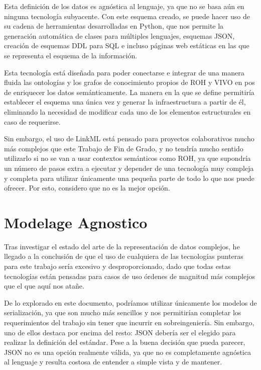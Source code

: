 \documentclass[12pt,a4paper]{article}
\begin{document}
Esta definición de los datos es agnóstica al lenguaje, ya que no se basa aún en ninguna tecnología subyacente. Con este esquema creado, se puede hacer uso de su cadena de herramientas desarrolladas en Python, que nos permite la generación automática de clases para múltiples lenguajes, esquemas JSON, creación de esquemas DDL para SQL e incluso páginas web estáticas en las que se representa el esquema de la información.

Esta tecnología está diseñada para poder conectarse e integrar de una manera fluida las ontologías y los grafos de conocimiento propios de ROH y VIVO en pos de enriquecer los datos semánticamente. La manera en la que se define permitiría establecer el esquema una única vez y generar la infraestructura a partir de él, eliminando la necesidad de modificar cada uno de los elementos estructurales en caso de requerirse.

Sin embargo, el uso de LinkML está pensado para proyectos colaborativos mucho más complejos que este Trabajo de Fin de Grado, y no tendría mucho sentido utilizarlo si no se van a usar contextos semánticos como ROH, ya que supondría un número de pasos extra a ejecutar y depender de una tecnología muy compleja y completa para utilizar únicamente una pequeña parte de todo lo que nos puede ofrecer. Por esto, considero que no es la mejor opción.


\section{Modelage Agnostico}

Tras investigar el estado del arte de la representación de datos complejos, he llegado a la conclusión de que el uso de cualquiera de las tecnologías punteras para este trabajo sería excesivo y desproporcionado, dado que todas estas tecnologías están pensadas para casos de uso órdenes de magnitud más complejos que el que aquí nos atañe.

\newpage

De lo explorado en este documento, podríamos utilizar únicamente los modelos de serialización, ya que son mucho más sencillos y nos permitirían completar los requerimientos del trabajo sin tener que incurrir en sobreingeniería. Sin embargo, uno de ellos destaca por encima del resto: JSON debería ser el elegido para realizar la definición del estándar. Pese a la buena decisión que pueda parecer, JSON no es una opción realmente válida, ya que no es completamente agnóstica al lenguaje y resulta costosa de entender a simple vista y de mantener.
\end{document}
